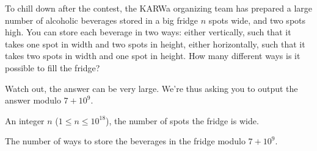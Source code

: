 \problemname{\problemyamlname}



To chill down after the contest, the KARWa organizing team has prepared a large number of alcoholic beverages stored in a big fridge $n$ spots wide, and two spots high.
You can store each beverage in two ways: either vertically, such that it takes one spot in width and two spots in height, either horizontally, such that it takes two spots in width and one spot in height.
How many different ways is it possible to fill the fridge?

Watch out, the answer can be very large.
We're thus asking you to output the answer modulo $7+10^9$.

\begin{Input}
	An integer $n$ ($1 \le n \le 10^{18}$), the number of spots the fridge is wide.
\end{Input}

\begin{Output}
	The number of ways to store the beverages in the fridge modulo $7+10^9$.
\end{Output}
